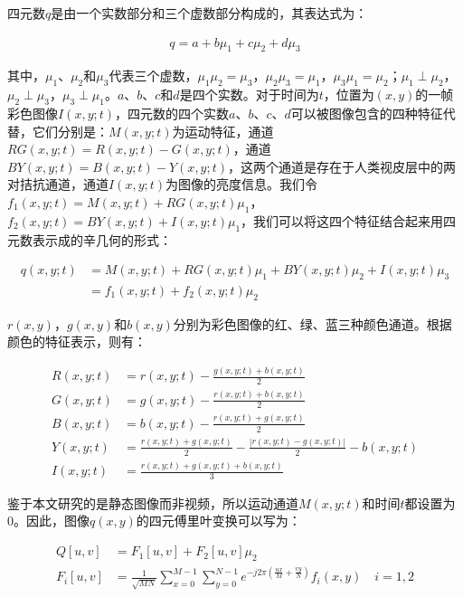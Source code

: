 四元数$q$是由一个实数部分和三个虚数部分构成的，其表达式为：
\begin{linenomath}
\begin{align}
q=a+b\mu_{1}+c\mu_{2}+d\mu_{3}
\label{式4_10}
\end{align}
\end{linenomath}
其中，$\mu_{1}$、$\mu_{2}$和$\mu_{3}$代表三个虚数，$\mu_{1}\mu_{2}=\mu_{3}$，$\mu_{2}\mu_{3}=\mu_{1}$，$\mu_{3}\mu_{1}=\mu_{2}$；$\mu_{1}\perp\mu_{2}$，$\mu_{2}\perp\mu_{3}$，$\mu_{3}\perp\mu_{1}$。$a$、$b$、$c$和$d$是四个实数。对于时间为$t$，位置为$(x,y)$的一帧彩色图像$I(x,y;t)$，四元数的四个实数$a$、$b$、$c$、$d$可以被图像包含的四种特征代替，它们分别是：$M(x,y;t)$为运动特征，通道$RG(x,y;t)=R(x,y;t)-G(x,y;t)$，通道$BY(x,y;t)=B(x,y;t)-Y(x,y;t)$，这两个通道是存在于人类视皮层中的两对拮抗通道，通道$I(x,y;t)$为图像的亮度信息。我们令$f_{1}(x,y;t)=M(x,y;t)+RG(x,y;t)\mu_{1}$，$f_{2}(x,y;t)=BY(x,y;t)+I(x,y;t)\mu_{1}$，我们可以将这四个特征结合起来用四元数表示成的辛几何的形式：
\begin{linenomath}
\begin{align}
q(x,y;t) &= M(x,y;t)+RG(x,y;t)\mu_1+BY(x,y;t)\mu_2+I(x,y;t)\mu_3\nonumber\\
 &= f_1(x,y;t)+f_2(x,y;t)\mu_2
\label{式4_11}
\end{align}
\end{linenomath}
$r(x,y)$，$g(x,y)$和$b(x,y)$分别为彩色图像的红、绿、蓝三种颜色通道。根据颜色的特征表示，则有：
\begin{linenomath}
\begin{align}
R(x,y;t) &= r(x,y;t)-\frac{g(x,y;t)+b(x,y;t)}{2}\label{式4_12}\\
G(x,y;t) &= g(x,y;t)-\frac{r(x,y;t)+b(x,y;t)}{2}\label{式4_13}\\
B(x,y;t) &= b(x,y;t)-\frac{r(x,y;t)+g(x,y;t)}{2}\label{式4_14}\\
Y(x,y;t) &= \frac{r(x,y;t)+g(x,y;t)}{2}-\frac{\left|r(x,y;t)-g(x,y;t)\right|}{2}-b(x,y;t)\label{式4_15}\\
I(x,y;t) &= \frac{r(x,y;t)+g(x,y;t)+b(x,y;t)}{3}\label{式4_16}
\end{align}
\end{linenomath}
鉴于本文研究的是静态图像而非视频，所以运动通道$M(x,y;t)$和时间$t$都设置为0。因此，图像$q(x,y)$的四元傅里叶变换可以写为：
\begin{linenomath}
\begin{align}
Q[u,v] &= F_1[u,v]+F_2[u,v]\mu_2\label{式4_17}\\
F_i[u,v] &= \frac{1}{\sqrt{MN}}\sum_{x=0}^{M-1}\sum_{y=0}^{N-1}e^{-j 2\pi\left(\frac{ux}{M}+\frac{vy}{N}\right)}f_{i}(x,y)\quad i=1,2
\label{式4_18}
\end{align}
\end{linenomath}

